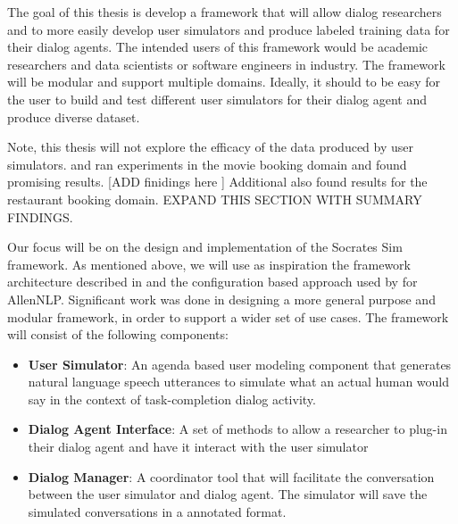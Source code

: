 The goal of this thesis is develop a framework that will allow dialog researchers and to more easily develop user simulators and produce labeled training data for their dialog agents. The intended users of this framework would be academic researchers and data scientists or software engineers in industry. The framework will be modular and support multiple domains. Ideally, it should to be easy for the user to build and test different user simulators for their dialog agent and produce diverse dataset. 

Note, this thesis will not explore the efficacy of the data produced by user simulators. \cite{li_end_to_end}  and \cite{li_usersim} ran experiments in the movie booking domain and found promising results. [ADD finidings here ] Additional \cite{BordesW16} also found results for the restaurant booking domain. EXPAND THIS SECTION WITH SUMMARY FINDINGS.  

Our focus will be on the design and implementation of the Socrates Sim framework. As mentioned above, we will use as inspiration the framework architecture described in \cite{li_usersim} and the configuration based approach used by \cite{Gardner_allennlp} for AllenNLP. Significant work was done in designing a more general purpose and modular framework, in order to support a wider set of use cases. 
 The framework will consist of the following components:
\begin{itemize}
	\item \textbf{User Simulator}: An agenda based user modeling component that generates natural language speech utterances to simulate what an actual human would say in the context of task-completion dialog activity. 
	\item \textbf{Dialog Agent Interface}: A set of methods to allow a researcher to plug-in their dialog agent and have it interact with the user simulator
	\item \textbf{Dialog Manager}: A coordinator tool that will facilitate the conversation between the user simulator and dialog agent. The simulator will save the simulated conversations in a annotated format.
\end{itemize}

